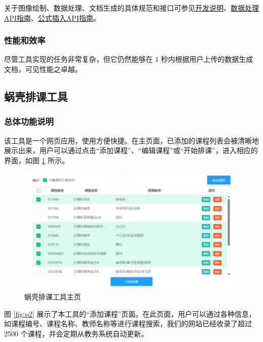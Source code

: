 关于图像绘制、数据处理、文档生成的具体规范和接口可参见\href{https://github.com/feixukeji/PhyX/blob/main/README.md}{{开发说明}}、\href{https://github.com/feixukeji/PhyX/blob/main/%E6%95%B0%E6%8D%AE%E5%A4%84%E7%90%86API%E6%8C%87%E5%8D%97.md}{{数据处理API指南}}、\href{https://github.com/feixukeji/PhyX/blob/main/%E5%85%AC%E5%BC%8F%E6%8F%92%E5%85%A5API%E6%8C%87%E5%8D%97.md}{{公式插入API指南}}。

\subsubsection{性能和效率}

尽管工具实现的任务非常复杂，但它仍然能够在 1 秒内根据用户上传的数据生成文档，可见性能之卓越。

\subsection{蜗壳排课工具}

\subsubsection{总体功能说明}

该工具是一个网页应用，使用方便快捷。在主页面，已添加的课程列表会被清晰地展示出来，用户可以通过点击“添加课程”、“编辑课程”或“开始排课”，进入相应的界面，如图 \ref{fig:p1} 所示。

\begin{figure}[htbp]
  \centering
  \includegraphics[width=\columnwidth]{figure/p1.png}
  \caption{蜗壳排课工具主页}
  \label{fig:p1}
\end{figure}

图 \ref{fig:p2} 展示了本工具的“添加课程”页面。在此页面，用户可以通过各种信息，如课程编号、课程名称、教师名称等进行课程搜索，我们的网站已经收录了超过 2500 个课程，并会定期从教务系统自动更新。

